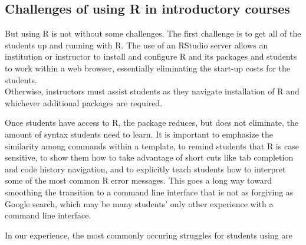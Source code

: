 \subsection{Challenges of using R in introductory
courses}\label{challenges-of-using-r-in-introductory-courses}

But using R is not without some challenges. The first challenge is to
get all of the students up and running with R. The use of an RStudio
server allows an institution or instructor to install and configure R
and its packages and students to work within a web browser, essentially
eliminating the start-up costs for the students.\\
Otherwise, instructors must assist students as they navigate
installation of R and whichever additional packages are required.

Once students have access to R, the  package reduces, but
does not eliminate, the amount of syntax students need to learn. It is
important to emphasize the similarity among commands within a template,
to remind students that R is case sensitive, to show them how to take
advantage of short cuts like tab completion and code history navigation,
and to explicitly teach students how to interpret some of the most
common R error messages. This goes a long way toward smoothing the
transition to a command line interface that is not as forgiving as
Google search, which may be many students' only other experience with a
command line interface.

In our experience, the most commonly occuring struggles for students
using  are

